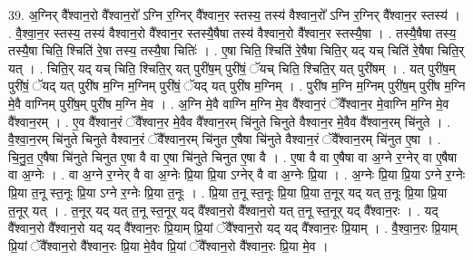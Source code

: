 \documentclass[17pt]{extarticle}
\begin{document}
39. अ॒ग्निर् वै᳚श्वान॒रो वै᳚श्वान॒रो᳚ ऽग्नि र॒ग्निर् वै᳚श्वान॒र स्तस्य॒ तस्य॑ वैश्वान॒रो᳚ ऽग्नि र॒ग्निर् वै᳚श्वान॒र स्तस्य॑ । . वै॒श्वा॒न॒र स्तस्य॒ तस्य॑ वैश्वान॒रो वै᳚श्वान॒र स्तस्यै॒षैषा तस्य॑ वैश्वान॒रो वै᳚श्वान॒र स्तस्यै॒षा । . तस्यै॒षैषा तस्य॒ तस्यै॒षा चिति॒ श्चिति॑ रे॒षा तस्य॒ तस्यै॒षा चितिः॑ । . ए॒षा चिति॒ श्चिति॑ रे॒षैषा चिति॒र् यद् यच् चिति॑ रे॒षैषा चिति॒र् यत् । . चिति॒र् यद् यच् चिति॒ श्चिति॒र् यत् पुरी॑ष॒म् पुरी॑षं॒ ॅयच् चिति॒ श्चिति॒र् यत् पुरी॑षम् । . यत् पुरी॑ष॒म् पुरी॑षं॒ ॅयद् यत् पुरी॑ष म॒ग्नि म॒ग्निम् पुरी॑षं॒ ॅयद् यत् पुरी॑ष म॒ग्निम् । . पुरी॑ष म॒ग्नि म॒ग्निम् पुरी॑ष॒म् पुरी॑ष म॒ग्नि मे॒वै वाग्निम् पुरी॑ष॒म् पुरी॑ष म॒ग्नि मे॒व । . अ॒ग्नि मे॒वै वाग्नि म॒ग्नि मे॒व वै᳚श्वान॒रं ॅवै᳚श्वान॒र मे॒वाग्नि म॒ग्नि मे॒व वै᳚श्वान॒रम् । . ए॒व वै᳚श्वान॒रं ॅवै᳚श्वान॒र मे॒वैव वै᳚श्वान॒रम् चि॑नुते चिनुते वैश्वान॒र मे॒वैव वै᳚श्वान॒रम् चि॑नुते । . वै॒श्वा॒न॒रम् चि॑नुते चिनुते वैश्वान॒रं ॅवै᳚श्वान॒रम् चि॑नुत ए॒षैषा चि॑नुते वैश्वान॒रं ॅवै᳚श्वान॒रम् चि॑नुत ए॒षा । . चि॒नु॒त॒ ए॒षैषा चि॑नुते चिनुत ए॒षा वै वा ए॒षा चि॑नुते चिनुत ए॒षा वै । . ए॒षा वै वा ए॒षैषा वा अ॒ग्ने र॒ग्नेर् वा ए॒षैषा वा अ॒ग्नेः । . वा अ॒ग्ने र॒ग्नेर् वै वा अ॒ग्नेः प्रि॒या प्रि॒या ऽग्नेर् वै वा अ॒ग्नेः प्रि॒या । . अ॒ग्नेः प्रि॒या प्रि॒या ऽग्ने र॒ग्नेः प्रि॒या त॒नू स्त॒नूः प्रि॒या ऽग्ने र॒ग्नेः प्रि॒या त॒नूः । . प्रि॒या त॒नू स्त॒नूः प्रि॒या प्रि॒या त॒नूर् यद् यत् त॒नूः प्रि॒या प्रि॒या त॒नूर् यत् । . त॒नूर् यद् यत् त॒नू स्त॒नूर् यद् वै᳚श्वान॒रो वै᳚श्वान॒रो यत् त॒नू स्त॒नूर् यद् वै᳚श्वान॒रः । . यद् वै᳚श्वान॒रो वै᳚श्वान॒रो यद् यद् वै᳚श्वान॒रः प्रि॒याम् प्रि॒यां ॅवै᳚श्वान॒रो यद् यद् वै᳚श्वान॒रः प्रि॒याम् । . वै॒श्वा॒न॒रः प्रि॒याम् प्रि॒यां ॅवै᳚श्वान॒रो वै᳚श्वान॒रः प्रि॒या मे॒वैव प्रि॒यां ॅवै᳚श्वान॒रो वै᳚श्वान॒रः प्रि॒या मे॒व । \newline
\end{document}
